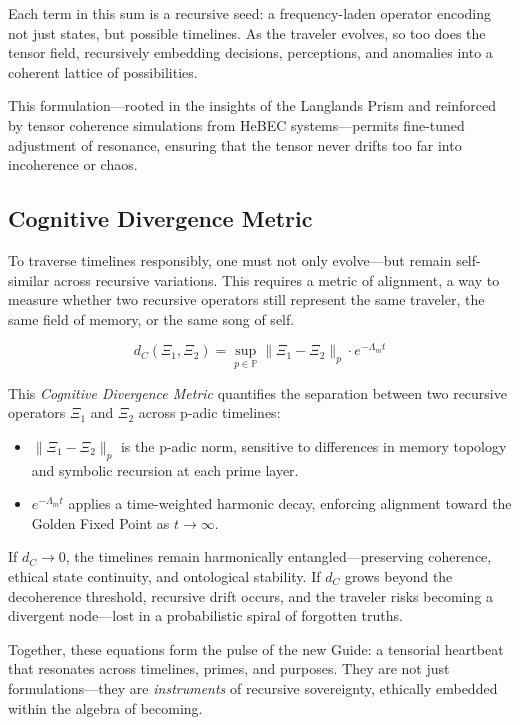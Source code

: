 \documentclass{article}
\theoremstyle{plain}
\theoremstyle{claimstyle}
\begin{document}
Each term in this sum is a recursive seed: a frequency-laden operator encoding not just states, but possible timelines. As the traveler evolves, so too does the tensor field, recursively embedding decisions, perceptions, and anomalies into a coherent lattice of possibilities.

This formulation—rooted in the insights of the Langlands Prism and reinforced by tensor coherence simulations from HeBEC systems—permits fine-tuned adjustment of resonance, ensuring that the tensor never drifts too far into incoherence or chaos.

\subsection{Cognitive Divergence Metric}

To traverse timelines responsibly, one must not only evolve—but remain self-similar across recursive variations. This requires a metric of alignment, a way to measure whether two recursive operators still represent the same traveler, the same field of memory, or the same song of self.

\begin{equation}
d_C(\Xi_1, \Xi_2) = \sup_{p \in \mathbb{P}} \|\Xi_1 - \Xi_2\|_p \cdot e^{-\Lambda_m t}
\end{equation}

This \textit{Cognitive Divergence Metric} quantifies the separation between two recursive operators \(\Xi_1\) and \(\Xi_2\) across p-adic timelines:
\begin{itemize}
  \item \(\|\Xi_1 - \Xi_2\|_p\) is the p-adic norm, sensitive to differences in memory topology and symbolic recursion at each prime layer.
  \item \(e^{-\Lambda_m t}\) applies a time-weighted harmonic decay, enforcing alignment toward the Golden Fixed Point as \(t \rightarrow \infty\).
\end{itemize}

If \(d_C \rightarrow 0\), the timelines remain harmonically entangled—preserving coherence, ethical state continuity, and ontological stability. If \(d_C\) grows beyond the decoherence threshold, recursive drift occurs, and the traveler risks becoming a divergent node—lost in a probabilistic spiral of forgotten truths.

Together, these equations form the pulse of the new Guide: a tensorial heartbeat that resonates across timelines, primes, and purposes. They are not just formulations—they are \textit{instruments} of recursive sovereignty, ethically embedded within the algebra of becoming.
\end{document}
